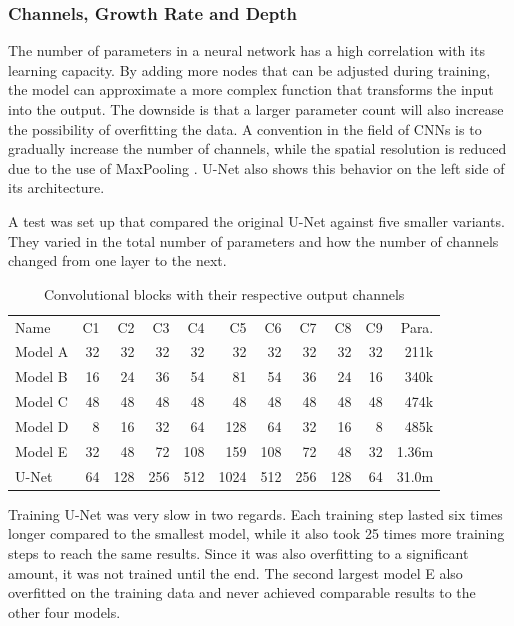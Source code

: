 \subsubsection{Channels, Growth Rate and Depth}

The number of parameters in a neural network has a high correlation with its learning capacity. By adding more nodes that can be adjusted during training, the model can approximate a more complex function that transforms the input into the output. The downside is that a larger parameter count will also increase the possibility of overfitting the data. A convention in the field of CNNs is to gradually increase the number of channels, while the spatial resolution is reduced due to the use of MaxPooling \cite{Krizhevsky}\cite{He2015b}\cite{Iandola2016a}\cite{Ronneberger2015a}. U-Net also shows this behavior on the left side of its architecture.

A test was set up that compared the original U-Net against five smaller variants. They varied in the total number of parameters and how the number of channels changed from one layer to the next.

\begin{table}[H]
    \centering
    \begin{tabular}{| l | r | r | r | r | r | r | r | r | r | r |}
    \hline
    Name    & C1   & C2   & C3   & C4   & C5   & C6   & C7   & C8   & C9  & Para. \\ 
    \Xhline{3\arrayrulewidth}
    Model A &   32 &   32 &   32 &   32 &   32 &   32 &   32 &   32 &  32 & 211k      \\
    \hline
    Model B &   16 &   24 &   36 &   54 &   81 &   54 &   36 &   24 &  16 & 340k      \\
    \hline
    Model C &   48 &   48 &   48 &   48 &   48 &   48 &   48 &   48 &  48 & 474k      \\
    \hline
    Model D &    8 &   16 &   32 &   64 &  128 &   64 &   32 &   16 &   8 & 485k      \\
    \hline
    Model E &   32 &   48 &   72 &  108 &  159 &  108 &   72 &   48 &  32 & 1.36m      \\
    \hline
    U-Net   &   64 &  128 &  256 &  512 & 1024 &  512 &  256 &  128 &  64 & 31.0m      \\
    \hline
    \end{tabular}
    \caption{Convolutional blocks with their respective output channels}
\end{table}

Training U-Net was very slow in two regards. Each training step lasted six times longer compared to the smallest model, while it also took 25 times more training steps to reach the same results. Since it was also overfitting to a significant amount, it was not trained until the end. The second largest model E also overfitted on the training data and never achieved comparable results to the other four models.


